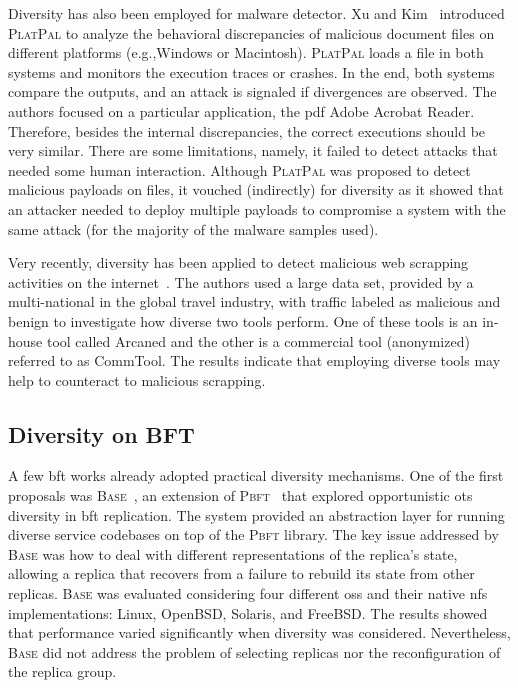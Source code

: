 Diversity has also been employed for malware detector. 
Xu and Kim~\cite{Xu:2017a} introduced \textsc{PlatPal} to analyze the behavioral discrepancies of malicious document files on different platforms (e.g.,Windows or Macintosh).
\textsc{PlatPal} loads a file in both systems and monitors the execution traces or crashes. 
In the end, both systems compare the outputs, and an attack is signaled if divergences are observed.
The authors focused on a particular application, the pdf Adobe Acrobat Reader.
Therefore, besides the internal discrepancies, the correct executions should be very similar.
There are some limitations, namely, it failed to detect attacks that needed some human interaction.
Although \textsc{PlatPal} was proposed to detect malicious payloads on files, it vouched (indirectly) for diversity as it showed that an attacker needed to deploy multiple payloads to compromise a system with the same attack (for the majority of the malware samples used).


Very recently, diversity has been applied to detect malicious web scrapping activities on the internet~\cite{Marques:2018}.
The authors used a large data set, provided by a multi-national in the global travel industry, with traffic labeled as malicious and benign to investigate how diverse two tools perform. 
One of these tools is an in-house tool called Arcaned and the other is a commercial tool (anonymized) referred to as CommTool.
The results indicate that employing diverse tools may help to counteract to malicious scrapping.


\subsection{Diversity on BFT}
A few \gls{bft} works already adopted practical diversity mechanisms. 
One of the first proposals was \textsc{Base}~\cite{Castro:2003}, an extension of \textsc{Pbft}~\cite{Castro:1999} that explored opportunistic \gls{ots} diversity in \gls{bft} replication.
The system provided an abstraction layer for running diverse service codebases on top of the \textsc{Pbft} library.
The key issue addressed by \textsc{Base} was how to deal with different representations of the replica's state, allowing a replica that recovers from a failure to rebuild its state from other replicas. 
\textsc{Base} was evaluated considering four different \glspl{os} and their native \gls{nfs} implementations: Linux, OpenBSD, Solaris, and FreeBSD.
The results showed that performance varied significantly when diversity was considered.
Nevertheless, \textsc{Base} did not address the problem of selecting replicas nor the reconfiguration of the replica group.

